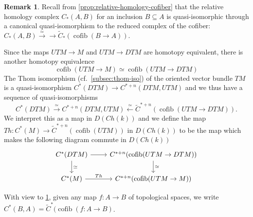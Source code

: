 \documentclass{scrartcl}
\theoremstyle{plain}
\newtheorem{lemma}[theorem]{Lemma}
\theoremstyle{definition}
\newtheorem{remark}[theorem]{Remark}
\renewcommand{\subset}{\subseteq}
\newcommand{\cupp}{\mathbin{\smile}}
\DeclareMathOperator{\cone}{cone}
\DeclareMathOperator{\cofib}{cofib}
\newcommand{\iso}{\cong}
\newcommand{\quiso}{\simeq}
\let\xto\xrightarrow
\let\xfrom\xleftarrow
\newcommand{\blank}{-}
\begin{document}
\begin{remark}\label{rmk:cofib-relative-homology}
Recall from \cref{prop:relative-homology-cofiber} that the relative homology complex $C_*(A, B)$ for an inclusion $B\subset A$ is quasi-isomorphic through a canonical quasi-isomorphism to the reduced complex of the cofiber: $C_*(A, B)\xto{\quiso} \to \tilde C_*(\cofib(B\to A))$.
\end{remark}

Since the maps $UTM\to M$ and $UTM\to DTM$ are homotopy equivalent, there is another homotopy equivalence
$$\cofib(UTM\to M)\quiso \cofib(UTM\to DTM)$$
The Thom isomorphism (cf.\ \cref{subsec:thom-iso}) of the oriented vector bundle $TM$ is a quasi-isomorphism $C^*(DTM)\to C^{*+n}(DTM, UTM)$ and we thus have a sequence of quasi-isomorphisms
$$C^*(DTM)\xto{\quiso} C^{*+n}(DTM, UTM)\xfrom{\quiso} \tilde C^{*+n}(\cofib(UTM\to DTM)).$$ We interpret this as a map in $D(Ch(k))$ and we define the map $Th\colon C^*(M)\to \tilde C^{*+n}(\cofib(UTM))$ in $D(Ch(k))$ to be the map which makes the following diagram commute in $D(Ch(k))$
\[\begin{tikzcd}
    C^*(DTM) \dar["\quiso"] \rar & C^{*+n}(\cofib(UTM \to DTM)) \dar["\quiso"] \\
    C^*(M) \rar["Th"] & C^{*+n}(\cofib(UTM\to M))
\end{tikzcd}\]



With view to \cref{rmk:cofib-relative-homology}, given any map $f\colon A\to B$ of topological spaces, we write $C^*(B, A) = \tilde C^*(\cofib(f\colon A\to B)$. 
\end{document}
